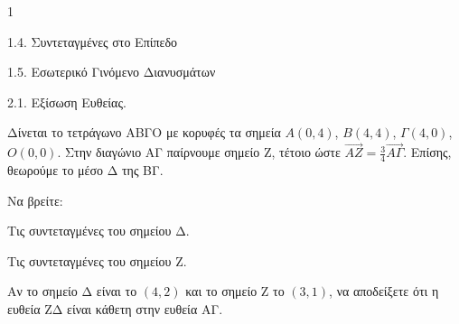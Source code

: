 \begin{ylh}{1}
    \item 1.4. Συντεταγμένες στο Επίπεδο
    \item 1.5. Εσωτερικό Γινόμενο Διανυσμάτων
    \item 2.1. Εξίσωση Ευθείας.
\end{ylh}
\begin{figure} %
\centering
{}
\end{figure}
Δίνεται το τετράγωνο ΑΒΓΟ με κορυφές τα σημεία $A(0,4)$, $B(4,4)$, $\Gamma(4,0)$, $O(0,0)$. Στην διαγώνιο ΑΓ παίρνουμε σημείο Ζ, τέτοιο ώστε $\vec{AZ} = \frac{3}{4}\vec{A\Gamma}$. Επίσης, θεωρούμε το μέσο Δ της ΒΓ.

\begin{alist}
    \item Να βρείτε:
    \begin{rlist}
        \item Τις συντεταγμένες του σημείου Δ. 
        \item Τις συντεταγμένες του σημείου Ζ. 
    \end{rlist}
    \item Αν το σημείο Δ είναι το $(4,2)$ και το σημείο Ζ το $(3,1)$, να αποδείξετε ότι η ευθεία ΖΔ είναι κάθετη στην ευθεία ΑΓ. 
\end{alist}